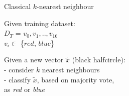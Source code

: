 \documentclass[10pt]{beamer}
\begin{document}
{
\begin{frame}[fragile]{Classical $k$-nearest neighbour}


\begin{minipage}[t]{.32\textwidth}
Given training dataset:\\
${D}_{T}$ = ${v}_{0}, {v}_{1},..,{v}_{16}$ \\
$v_{i} \in$ \{$red$, $blue$\}
\end{minipage}
\hspace{0.2cm}
\begin{minipage}[t]{.53\textwidth}
Given a new vector $\tilde{x}$ (black halfcircle):\\
- consider $k$ nearest neighbours\\
- classify $\tilde{x}$, based on majority vote,\\as \emph{red} or \emph{blue}
\end{minipage}


\end{frame}}
\end{document}
